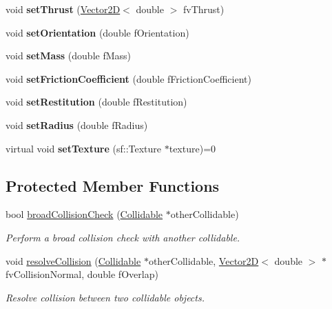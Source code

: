 \begin{DoxyCompactItemize}
\item 
\hypertarget{class_collidable_a2fa1b52be385f9ff2cf08670a9606cc1}{}void {\bfseries set\+Thrust} (\hyperlink{class_vector2_d}{Vector2\+D}$<$ double $>$ fv\+Thrust)\label{class_collidable_a2fa1b52be385f9ff2cf08670a9606cc1}

\item 
\hypertarget{class_collidable_aabf7ace85a4c054cee3553686efd831b}{}void {\bfseries set\+Orientation} (double f\+Orientation)\label{class_collidable_aabf7ace85a4c054cee3553686efd831b}

\item 
\hypertarget{class_collidable_a0e7594f377c9ce8e47edf88b49e75f81}{}void {\bfseries set\+Mass} (double f\+Mass)\label{class_collidable_a0e7594f377c9ce8e47edf88b49e75f81}

\item 
\hypertarget{class_collidable_ae245dadba8e78387701796177e1e635e}{}void {\bfseries set\+Friction\+Coefficient} (double f\+Friction\+Coefficient)\label{class_collidable_ae245dadba8e78387701796177e1e635e}

\item 
\hypertarget{class_collidable_aee5e648d122a9dad08cfc04b2a84e079}{}void {\bfseries set\+Restitution} (double f\+Restitution)\label{class_collidable_aee5e648d122a9dad08cfc04b2a84e079}

\item 
\hypertarget{class_collidable_a80b43860029e06e0baae666c762b6521}{}void {\bfseries set\+Radius} (double f\+Radius)\label{class_collidable_a80b43860029e06e0baae666c762b6521}

\item 
\hypertarget{class_collidable_ab591b36248e5178a6e3a430d3eb67144}{}virtual void {\bfseries set\+Texture} (sf\+::\+Texture $\ast$texture)=0\label{class_collidable_ab591b36248e5178a6e3a430d3eb67144}

\end{DoxyCompactItemize}
\subsection*{Protected Member Functions}
\begin{DoxyCompactItemize}
\item 
bool \hyperlink{class_collidable_a3d3ce584cdb14485db044c81a792a966}{broad\+Collision\+Check} (\hyperlink{class_collidable}{Collidable} $\ast$other\+Collidable)
\begin{DoxyCompactList}\small\item\em Perform a broad collision check with another collidable. \end{DoxyCompactList}\item 
void \hyperlink{class_collidable_a40089393c9a030b68042e3b72d8142e4}{resolve\+Collision} (\hyperlink{class_collidable}{Collidable} $\ast$other\+Collidable, \hyperlink{class_vector2_d}{Vector2\+D}$<$ double $>$ $\ast$fv\+Collision\+Normal, double f\+Overlap)
\begin{DoxyCompactList}\small\item\em Resolve collision between two collidable objects. \end{DoxyCompactList}\end{DoxyCompactItemize}
